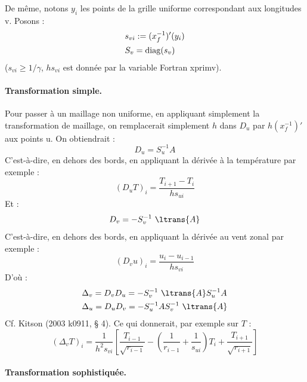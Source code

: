 \documentclass[a4paper,english,french]{article}
\begin{document}
De même, notons $y_i$ les points de la grille uniforme correspondant
aux longitudes v. Posons :
\begin{align}
  \notag
  & s_{vi} := (x_f^{-1})'(y_i) \\
  \label{eq:S_v}
  & S_v = \mathrm{diag}(s_v)
\end{align}
($s_{vi} \ge 1 / \gamma$, $h s_{vi}$ est donnée par la variable Fortran
xprimv).

\paragraph{Transformation simple.}

Pour passer à un maillage non uniforme, en appliquant simplement la
transformation de maillage, on remplacerait simplement $h$ dans $D_u$
par $h (x_f^{-1})'$ aux points u. On obtiendrait :
\begin{equation*}
  D_u = S_u^{-1} A
\end{equation*}
C'est-à-dire, en dehors des bords, en appliquant la dérivée à la
température par exemple :
\begin{equation*}
  (D_u T)_i = \frac{T_{i + 1} - T_i}{h s_{ui}}
\end{equation*}
Et :
\begin{equation*}
  D_v = - S_v^{-1}\ \ltrans{A}
\end{equation*}
C'est-à-dire, en dehors des bords, en appliquant la dérivée au vent
zonal par exemple :
\begin{equation*}
  (D_v u)_i = \frac{u_i - u_{i - 1}}{h s_{vi}}
\end{equation*}
D'où :
\begin{align}
  \label{eq:delta_v_simple}
  & \Delta_v = D_v D_u = - S_v^{-1}\ \ltrans{A} S_u^{-1} A \\
  \notag
  & \Delta_u = D_u D_v = - S_u^{-1} A S_v^{-1}\ \ltrans{A}
\end{align}
Cf. Kitson (2003 k0911, § 4). Ce qui donnerait, par exemple sur $T$ :
\begin{equation*}
  (\Delta_v T)_i
  =
  \frac{1}{h^2 s_{vi}}
  \left[
    \frac{T_{i - 1}}{\sqrt{r_{i - 1}}}
    - \left(\frac{1}{r_{i - 1}} + \frac{1}{s_{ui}} \right) T_i
    + \frac{T_{i + 1}}{\sqrt{r_{i + 1}}}
  \right]
\end{equation*}

\paragraph{Transformation sophistiquée.}
\end{document}
